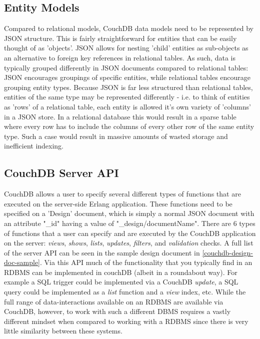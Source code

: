 \subsection{Entity Models}
Compared to relational models, CouchDB data models need to be represented by JSON structure. This is fairly straightforward for entities that can be easily thought of as 'objects'. JSON allows for nesting 'child' entities as sub-objects as an alternative to foreign key references in relational tables. As such, data is typically grouped differently in JSON documents compared to relational tables: JSON encourages groupings of specific entities, while relational tables encourage grouping entity types. Because JSON is far less structured than relational tables, entities of the same type may be represented differently - i.e. to think of entities as 'rows' of a relational table, each entity is allowed it's own variety of 'columns' in a JSON store. In a relational database this would result in a sparse table where every row has to include the columns of every other row of the same entity type. Such a case would result in massive amounts of wasted storage and inefficient indexing.

\subsection{CouchDB Server API}
CouchDB allows a user to specify several different types of functions that are executed on the server-side Erlang application. These functions need to be specified on a 'Design' document, which is simply a normal JSON document with an attribute "\_id" having a value of "\_design/documentName". There are 6 types of functions that a user can specify and are executed by the CouchDB application on the server: \textit{views}, \textit{shows}, \textit{lists}, \textit{updates}, \textit{filters}, and \textit{validation} checks. A full list of the server API can be seen in the sample design document in \ref{couchdb-design-doc-sample}. Via this API much of the functionality that you typically find in an RDBMS can be implemented in couchDB (albeit in a roundabout way). For example a SQL trigger could be implemented via a CouchDB \textit{update}, a SQL query could be implemented as a \textit{list} function and a \textit{view} index, etc. While the full range of data-interactions available on an RDBMS are available via CouchDB, however, to work with such a different DBMS requires a vastly different mindset when compared to working with a RDBMS since there is very little similarity between these systems.

